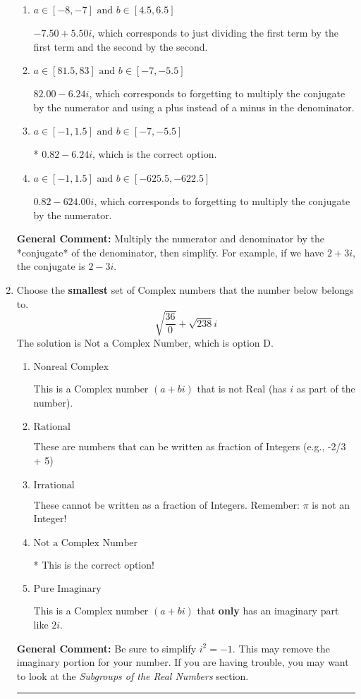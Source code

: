 \documentclass{extbook}[14pt]
\newcommand{\litem}[1]{\item #1

\rule{\textwidth}{0.4pt}}
\begin{document}
\begin{enumerate}
{\begin{enumerate}[label=\Alph*.]
 $-6.22  + 0.96 i$, which corresponds to forgetting to multiply the conjugate by the numerator and not computing the conjugate correctly.
\item \( a \in [-8, -7] \text{ and } b \in [4.5, 6.5] \)

 $-7.50  + 5.50 i$, which corresponds to just dividing the first term by the first term and the second by the second.
\item \( a \in [81.5, 83] \text{ and } b \in [-7, -5.5] \)

 $82.00  - 6.24 i$, which corresponds to forgetting to multiply the conjugate by the numerator and using a plus instead of a minus in the denominator.
\item \( a \in [-1, 1.5] \text{ and } b \in [-7, -5.5] \)

* $0.82  - 6.24 i$, which is the correct option.
\item \( a \in [-1, 1.5] \text{ and } b \in [-625.5, -622.5] \)

 $0.82  - 624.00 i$, which corresponds to forgetting to multiply the conjugate by the numerator.
\end{enumerate}

\textbf{General Comment:} Multiply the numerator and denominator by the *conjugate* of the denominator, then simplify. For example, if we have $2+3i$, the conjugate is $2-3i$.
}
\litem{
Choose the \textbf{smallest} set of Complex numbers that the number below belongs to.
\[ \sqrt{\frac{36}{0}}+\sqrt{238} i \]The solution is \( \text{Not a Complex Number} \), which is option D.\begin{enumerate}[label=\Alph*.]
\item \( \text{Nonreal Complex} \)

This is a Complex number $(a+bi)$ that is not Real (has $i$ as part of the number).
\item \( \text{Rational} \)

These are numbers that can be written as fraction of Integers (e.g., -2/3 + 5)
\item \( \text{Irrational} \)

These cannot be written as a fraction of Integers. Remember: $\pi$ is not an Integer!
\item \( \text{Not a Complex Number} \)

* This is the correct option!
\item \( \text{Pure Imaginary} \)

This is a Complex number $(a+bi)$ that \textbf{only} has an imaginary part like $2i$.
\end{enumerate}

\textbf{General Comment:} Be sure to simplify $i^2 = -1$. This may remove the imaginary portion for your number. If you are having trouble, you may want to look at the \textit{Subgroups of the Real Numbers} section.
}
\end{enumerate}
\end{document}
